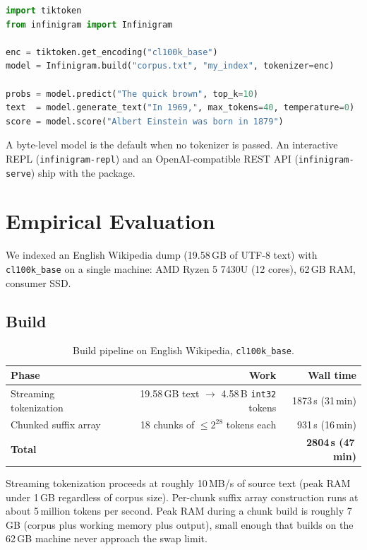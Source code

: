 \documentclass[11pt]{article}
\begin{document}
\begin{lstlisting}[language=Python]
import tiktoken
from infinigram import Infinigram

enc = tiktoken.get_encoding("cl100k_base")
model = Infinigram.build("corpus.txt", "my_index", tokenizer=enc)

probs = model.predict("The quick brown", top_k=10)
text  = model.generate_text("In 1969,", max_tokens=40, temperature=0)
score = model.score("Albert Einstein was born in 1879")
\end{lstlisting}

A byte-level model is the default when no tokenizer is passed. An interactive REPL (\texttt{infinigram-repl}) and an OpenAI-compatible REST API (\texttt{infinigram-serve}) ship with the package.

\section{Empirical Evaluation}

We indexed an English Wikipedia dump (19.58\,GB of UTF-8 text) with \texttt{cl100k\_base} on a single machine: AMD Ryzen 5 7430U (12 cores), 62\,GB RAM, consumer SSD.

\subsection{Build}

\begin{table}[h]
\centering
\begin{tabular}{lrr}
\toprule
Phase & Work & Wall time \\
\midrule
Streaming tokenization & 19.58\,GB text $\to$ 4.58\,B \texttt{int32} tokens & 1873\,s (31\,min) \\
Chunked suffix array   & 18 chunks of $\leq 2^{28}$ tokens each              & 931\,s (16\,min) \\
\textbf{Total}         &                                                     & \textbf{2804\,s (47\,min)} \\
\bottomrule
\end{tabular}
\caption{Build pipeline on English Wikipedia, \texttt{cl100k\_base}.}
\end{table}

Streaming tokenization proceeds at roughly 10\,MB/s of source text (peak RAM under 1\,GB regardless of corpus size). Per-chunk suffix array construction runs at about 5\,million tokens per second. Peak RAM during a chunk build is roughly 7\,GB (corpus plus working memory plus output), small enough that builds on the 62\,GB machine never approach the swap limit.
\end{document}
